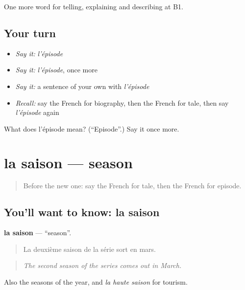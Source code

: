 \begin{grammarlens}[title={What you've built}]
One more word for telling, explaining and describing at B1.
\end{grammarlens}

\subsection*{Your turn}
\begin{itemize}
\raggedright
  \item \emph{Say it:} \emph{l'épisode}
  \item \emph{Say it:} \emph{l'épisode}, once more
  \item \emph{Say it:} a sentence of your own with \emph{l'épisode}
  \item \emph{Recall:} say the French for biography, then the French for tale, then say \emph{l'épisode} again
\end{itemize}

\begin{tcolorbox}[breakable,colback=teal!4,colframe=teal!35!black,title={Before you move on}]
What does l'épisode mean? (\textquotedblleft{}Episode\textquotedblright{}.) Say it once more.
\end{tcolorbox}
\section[la saison]{la saison — season}

\label{lesson:FR-C523-saison}



\begin{quote}
Before the new one: say the French for tale, then the French for episode.
\end{quote}

\subsection*{You'll want to know: la saison}
\textbf{la saison} — \textquotedblleft{}season\textquotedblright{}.

\begin{quote}
La deuxième saison de la série sort en mars.
\end{quote}

\begin{quote}
\emph{The second season of the series comes out in March.}
\end{quote}

Also the seasons of the year, and \emph{la haute saison} for tourism.

